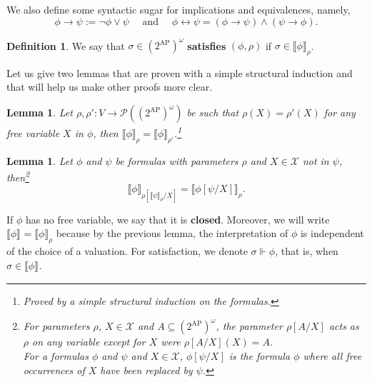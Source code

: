 \documentclass{tufte-handout} %
\newtheorem{lem}[thm]{Lemma}
\theoremstyle{definition}
\newtheorem{defn}[thm]{Definition}
\theoremstyle{remark}
\newcommand{\bra}[1]{\left(#1\right)}
\newcommand{\mP}{\mathcal{P}}
\newcommand{\0}{\textsf{0}}
\newcommand{\1}{\textsf{1}}
\newcommand{\mX}{\mathcal{X}}
\newcommand{\AP}{\text{AP}}
\newcommand{\sem}[2]{\llbracket #1 \rrbracket_{#2}}
\begin{document}
We also define some syntactic sugar for implications and equivalences, namely, 
\[\phi \rightarrow \psi := \neg \phi \vee \psi \quad \text{ and } \quad \phi \leftrightarrow \psi = (\phi \rightarrow \psi) \wedge (\psi \rightarrow \phi).\]
\begin{defn}
	We say that $\sigma \in (2^{\AP})^{\omega}$ \textbf{satisfies} $(\phi, \rho)$ if $\sigma \in \sem{\phi}{\rho}$.
\end{defn}
Let us give two lemmas that are proven with a simple structural induction and that will help us make other proofs more clear.
\begin{lem}\label{lem-sameparameters}
	Let $\rho, \rho': V\rightarrow \mP\bra{(2^{\AP})^{\omega}}$ be such that $\rho(X) = \rho'(X)$ for any free variable $X$ in $\phi$, then $\sem{\phi}{\rho} = \sem{\phi}{\rho'}$.\footnote{Proved by a simple structural induction on the formulas.}
\end{lem}
\begin{lem}\label{lem-subinform}
	Let $\phi$ and $\psi$ be formulas with parameters $\rho$ and $X \in \mX$ not in $\psi$, then\footnote{For parameters $\rho$, $X \in \mX$ and $A \subseteq (2^{\AP})^{\omega}$, the parameter $\rho[A/X]$ acts as $\rho$ on any variable except for $X$ were $\rho[A/X](X) = A$.\\
	For a formulas $\phi$ and $\psi$ and $X \in \mX$, $\phi[\psi/X]$ is the formula $\phi$ where all free occurrences of $X$ have been replaced by $\psi$.}
	\[\sem{\phi}{\rho[\sem{\psi}{\rho}/X]} = \sem{\phi[\psi/X]}{\rho}.\]
\end{lem}

If $\phi$ has no free variable, we say that it is \textbf{closed}. Moreover, we will write $\sem{\phi}{} = \sem{\phi}{\rho}$ because by the previous lemma, the interpretation of $\phi$ is independent of the choice of a valuation. For satisfaction, we denote $\sigma \Vdash \phi$, that is, when $\sigma \in \sem{\phi}{}$.
\end{document}
